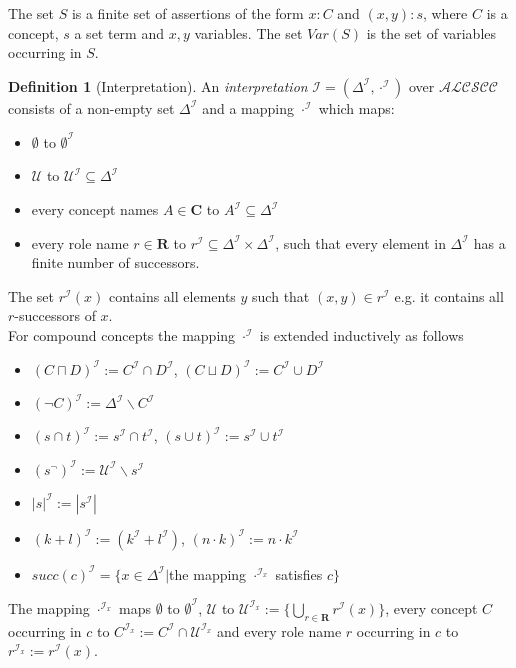 \documentclass[a4paper,11pt]{scrartcl}
\theoremstyle{break}
\theoremstyle{definition}
\newtheorem{mydef}{Definition}
\begin{document}
The set $S$ is a finite set of assertions of the form $x:C$ and $(x,y):s$, where $C$ is a concept, $s$ a set term and $x,y$ variables. The set $Var(S)$ is the set of variables occurring in $S$.
\begin{mydef}[Interpretation]
An \textit{interpretation} $\mathcal{I=(\Delta^\mathcal{I},\cdot^\mathcal{I})}$ over $\mathcal{ALCSCC}$ consists of a non-empty set $\Delta^\mathcal{I}$ and a mapping $\cdot^\mathcal{I}$ which maps:
\begin{itemize}
\item $\emptyset$ to $\emptyset^\mathcal{I}$
\item $\mathcal{U}$ to $\mathcal{U}^\mathcal{I}\subseteq \Delta^\mathcal{I}$
\item every concept names $A\in\mathbf{C}$ to $A^\mathcal{I}\subseteq \Delta^\mathcal{I}$
\item every role name $r\in\mathbf{R}$ to $r^\mathcal{I}\subseteq\Delta^\mathcal{I}\times\Delta^\mathcal{I}$, such that every element in $\Delta^\mathcal{I}$ has a finite number of successors.
\end{itemize}
The set $r^\mathcal{I}(x)$ contains all elements $y$ such that $(x,y)\in r^\mathcal{I}$ e.g. it contains all $r$-successors of $x$.\\
For compound concepts the mapping $\cdot^\mathcal{I}$ is extended inductively as follows
\begin{itemize}
\item $(C\sqcap D)^\mathcal{I}:=C^\mathcal{I}\cap D^\mathcal{I}$, $(C\sqcup D)^\mathcal{I}:=C^\mathcal{I}\cup D^\mathcal{I}$
\item $(\neg C)^\mathcal{I}:=\Delta^\mathcal{I}\backslash C^\mathcal{I}$
\item $(s\cap t)^\mathcal{I}:= s^\mathcal{I}\cap t^\mathcal{I}$, $(s\cup t)^\mathcal{I}:= s^\mathcal{I}\cup t^\mathcal{I}$
\item $(s^\neg)^\mathcal{I}:=\mathcal{U}^\mathcal{I}\backslash s^\mathcal{I}$
\item $|s|^\mathcal{I}:=|s^\mathcal{I}|$
\item $(k+l)^\mathcal{I}:=(k^\mathcal{I}+l^\mathcal{I})$, $(n\cdot k)^\mathcal{I}:= n\cdot k^\mathcal{I}$
\item $succ(c)^\mathcal{I}=\{x\in \Delta^\mathcal{I}|$the mapping $\cdot^{\mathcal{I}_x}$ satisfies $c\}$
\end{itemize}
The mapping $\cdot^{\mathcal{I}_x}$ maps $\emptyset$ to $\emptyset^\mathcal{I}$, $\mathcal{U}$ to $\mathcal{U}^{\mathcal{I}_x}:=\{\bigcup_{r\in\mathbf{R}}r^\mathcal{I}(x)\}$, every concept $C$ occurring in $c$ to $C^{\mathcal{I}_x}:=C^\mathcal{I}\cap \mathcal{U}^{\mathcal{I}_x}$ and every role name $r$ occurring in $c$ to $r^{\mathcal{I}_x}:=r^\mathcal{I}(x)$.\\

\end{mydef}
\end{document}
